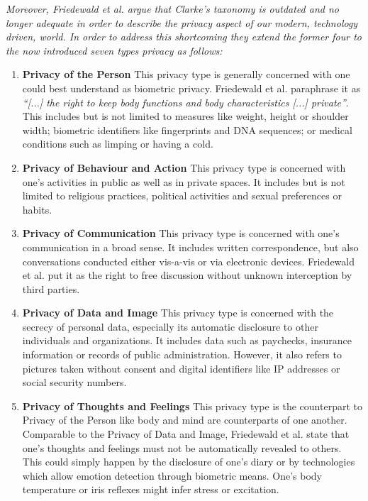 \documentclass[runningheads,a4paper]{llncs}
\newenvironment{LGContent}
{ \par\color{blue} \it \small }
{ \par }
\newcommand{\om}{[...]\xspace} %
\begin{document}
\begin{LGContent}
Moreover, Friedewald et al. argue that Clarke's taxonomy is outdated and no longer adequate in order to describe the privacy aspect of our modern, technology driven, world.
In order to address this shortcoming they extend the former four to the now introduced seven types privacy as follows:

\begin{enumerate}

\item \textbf{Privacy of the Person}
This privacy type is generally concerned with one could best understand as biometric privacy.
Friedewald et al. paraphrase it as \emph{``\om the right to keep body functions and body characteristics \om private''}.
This includes but is not limited to measures like weight, height or shoulder width;
biometric identifiers like fingerprints and DNA sequences;
or medical conditions such as limping or having a cold.


\item \textbf{Privacy of Behaviour and Action}
This privacy type is concerned with one's activities in public as well as in private spaces.
It includes but is not limited to religious practices, political activities and sexual preferences or habits.


\item \textbf{Privacy of Communication}
This privacy type is concerned with one's communication in a broad sense.
It includes written correspondence, but also conversations conducted either vis-a-vis or via electronic devices.
Friedewald et al. put it as the right to free discussion without unknown interception by third parties.


\item \textbf{Privacy of Data and Image}
This privacy type is concerned with the secrecy of personal data, especially its automatic disclosure to other individuals and organizations.
It includes data such as paychecks, insurance information or records of public administration.
However, it also refers to pictures taken without consent and digital identifiers like IP addresses or social security numbers.


\item \textbf{Privacy of Thoughts and Feelings}
This privacy type is the counterpart to Privacy of the Person like body and mind are counterparts of one another.
Comparable to the Privacy of Data and Image, Friedewald et al. state that one's thoughts and feelings must not be automatically revealed to others.
This could simply happen by the disclosure of one's diary or by technologies which allow emotion detection through biometric means.
One's body temperature or iris reflexes might infer stress or excitation.



\end{enumerate}
\end{LGContent}
\end{document}
